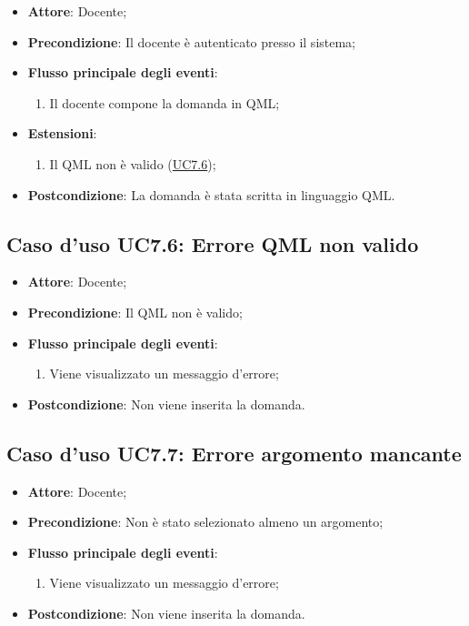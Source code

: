 \documentclass[12pt,a4paper]{article}
\begin{document}
\begin{itemize}

\item \textbf{Attore}: Docente; 
\item \textbf{Precondizione}: Il docente è autenticato presso il sistema;

\item \textbf{Flusso principale degli eventi}:
\begin{enumerate}
	\item Il docente compone la domanda in QML;
	
\end{enumerate}
\item \textbf{Estensioni}:
\begin{enumerate}
	\item Il QML non è valido (\hyperlink{UC7.6}{UC7.6});
	
\end{enumerate}
\item \textbf{Postcondizione}: La domanda è stata scritta in linguaggio QML.
\end{itemize}
\hypertarget{UC7.6}{}
\subsection{Caso d'uso UC7.6: Errore QML non valido}

\begin{itemize}

\item \textbf{Attore}: Docente; 
\item \textbf{Precondizione}: Il QML non è valido;

\item \textbf{Flusso principale degli eventi}:
\begin{enumerate}
	\item Viene visualizzato un messaggio d'errore;
	
\end{enumerate}
\item \textbf{Postcondizione}: Non viene inserita la domanda.
\end{itemize}
\hypertarget{UC7.7}{}
\subsection{Caso d'uso UC7.7: Errore argomento mancante}

\begin{itemize}

\item \textbf{Attore}: Docente; 
\item \textbf{Precondizione}: Non è stato selezionato almeno un argomento;

\item \textbf{Flusso principale degli eventi}:
\begin{enumerate}
	\item Viene visualizzato un messaggio d'errore;
	
\end{enumerate}
\item \textbf{Postcondizione}: Non viene inserita la domanda.
\end{itemize}
\hypertarget{UC8}{}
\end{document}
